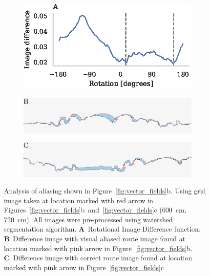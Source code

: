 \documentclass[letterpaper]{article}
\begin{document}
\begin{figure}[t]
    \begin{subfigure}[b]{\columnwidth}
        \includegraphics[width=\columnwidth]{figures/alias_ridf.eps}
    \end{subfigure}
    \begin{subfigure}[b]{\columnwidth}
        \includegraphics[width=\columnwidth]{figures/image_diff_bad.png}
    \end{subfigure}
    \begin{subfigure}[b]{\columnwidth}
        \includegraphics[width=\columnwidth]{figures/image_diff_good.png}
    \end{subfigure}
    \caption{Analysis of aliasing shown in Figure~\ref{fig:vector_fields}b.
    Using grid image taken at location marked with red arrow in Figures~\ref{fig:vector_fields}b~and~\ref{fig:vector_fields}c (\SI{600}{\centi\metre}, \SI{720}{\centi\metre}).
    All images were pre-processed using watershed segmentation algorithm.
    \textbf{A}~Rotational Image Difference function.
    \textbf{B}~Difference image with visual aliased route image found at location marked with pink arrow in Figure~\ref{fig:vector_fields}b.
    \textbf{C}~Difference image with correct route image found at location marked with pink arrow in Figure~\ref{fig:vector_fields}c}
    \label{fig:aliasing}
\end{figure}
\end{document}
